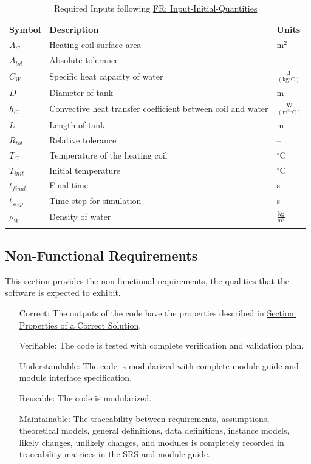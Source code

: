 \documentclass[12pt]{article}
\begin{document}
\begin{longtabu}{l X[l] l}
\toprule
\textbf{Symbol} & \textbf{Description} & \textbf{Units}
\\
\midrule
\endhead
${A_{C}}$ & Heating coil surface area & $\text{m}^{2}$
\\
${A_{tol}}$ & Absolute tolerance & --
\\
${C_{W}}$ & Specific heat capacity of water & $\frac{\text{J}}{(\text{kg}{}^{\circ}\text{C})}$
\\
$D$ & Diameter of tank & m
\\
${h_{C}}$ & Convective heat transfer coefficient between coil and water & $\frac{\text{W}}{(\text{m}^{2}{}^{\circ}\text{C})}$
\\
$L$ & Length of tank & m
\\
${R_{tol}}$ & Relative tolerance & --
\\
${T_{C}}$ & Temperature of the heating coil & ${}^{\circ}$C
\\
${T_{init}}$ & Initial temperature & ${}^{\circ}$C
\\
${t_{final}}$ & Final time & s
\\
${t_{step}}$ & Time step for simulation & s
\\
${ρ_{W}}$ & Density of water & $\frac{\text{kg}}{\text{m}^{3}}$
\\
\bottomrule
\caption{Required Inputs following \hyperref[inputInitQuants]{FR: Input-Initial-Quantities}}
\label{Table:ReqInputs}
\end{longtabu}
\subsection{Non-Functional Requirements}
\label{Sec:NFRs}
This section provides the non-functional requirements, the qualities that the software is expected to exhibit.
\begin{itemize}
\item[Correct:\phantomsection\label{correct}]The outputs of the code have the properties described in \hyperref[Sec:CorSolProps]{Section: Properties of a Correct Solution}.
\item[Verifiable:\phantomsection\label{verifiable}]The code is tested with complete verification and validation plan.
\item[Understandable:\phantomsection\label{understandable}]The code is modularized with complete module guide and module interface specification.
\item[Reusable:\phantomsection\label{reusable}]The code is modularized.
\item[Maintainable:\phantomsection\label{maintainable}]The traceability between requirements, assumptions, theoretical models, general definitions, data definitions, instance models, likely changes, unlikely changes, and modules is completely recorded in traceability matrices in the SRS and module guide.
\end{itemize}
\end{document}
